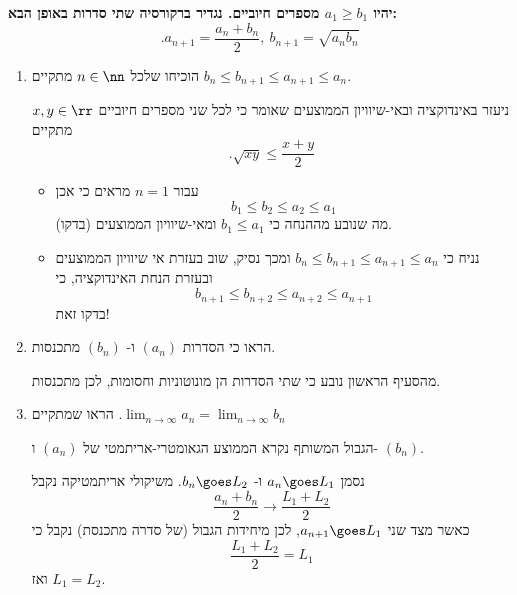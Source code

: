 \textbf{יהיו
$a_1\ge b_1$
מספרים חיוביים.
נגדיר ברקורסיה שתי סדרות באופן הבא:}
\[ .a_{n+1} = \frac{a_n+b_n}{2},~ b_{n+1} = \sqrt{a_nb_n}\]
\begin{enumerate}
\item
הוכיחו שלכל
$n \in\nn$
מתקיים
$b_{n} \le b_{n+1} \le a_{n+1} \le a_{n}$.
\begin{solbox}
ניעזר באינדוקציה ובאי-שיוויון הממוצעים שאומר כי לכל שני מספרים חיוביים
$x,y\in\rr$
מתקיים
$$.\sqrt{xy}\le \frac{x+y}{2}$$
\begin{itemize}
     \item
עבור
$n=1$
מראים כי אכן
$$b_1\le b_2\le a_2\le a_1$$
מה שנובע מההנחה כי
$b_1\le a_1$
ומאי-שיוויון הממוצעים (בדקו).
\item
נניח כי
$b_n\le b_{n+1}\le a_{n+1}\le a_n$
ומכך נסיק, שוב בעזרת אי שיוויון הממוצעים ובעזרת הנחת האינדוקציה, כי
$$b_{n+1}\le b_{n+2}\le a_{n+2}\le a_{n+1}$$
בדקו זאת!
 \end{itemize}
\end{solbox}
\item
הראו כי הסדרות
$(a_n)$
ו-
$(b_n)$
מתכנסות.
\begin{solbox}
    מהסעיף הראשון נובע כי שתי הסדרות הן מונוטוניות וחסומות, לכן מתכנסות.

\end{solbox}
\item
הראו שמתקיים
$.\lim_{n \to \infty}a_n
= \lim_{n \to \infty}b_n$

הגבול המשותף נקרא
הממוצע הגאומטרי-אריתמטי
של
$(a_n)$
ו-
$(b_n)$.
\begin{solbox}
    נסמן
$a_n\goes L_1$
ו- $b_n\goes L_2$.
משיקולי אריתמטיקה נקבל
$$\frac{a_n+b_n}{2}\rightarrow\frac{L_1+L_2}{2}$$
כאשר מצד שני
$a_{n+1}\goes L_1$,
לכן מיחידות הגבול (של סדרה מתכנסת) נקבל כי
$$\frac{L_1+L_2}{2}=L_1$$
ואז
$L_1=L_2$.
\end{solbox}
\end{enumerate}
